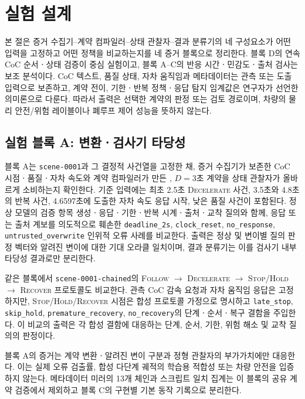 \section{실험 설계}
\label{sec:experiments}

본 절은 증거 수집기--계약 컴파일러--상태 관찰자--결과 분류기의 네 구성요소가 어떤 입력을 고정하고 어떤 정책을 비교하는지를 네 증거 블록으로 정리한다. 블록 D의 연속 CoC 순서ㆍ상태 검증이 중심 실험이고, 블록 A--C의 반응 시간ㆍ민감도ㆍ출처 검사는 보조 분석이다. CoC 텍스트, 품질 상태, 자차 움직임과 메타데이터는 관측 또는 도출 입력으로 보존하고, 계약 전이, 기한ㆍ반복 정책ㆍ응답 탐지 임계값은 연구자가 선언한 의미론으로 다룬다. 따라서 출력은 선택한 계약의 판정 또는 검토 경로이며, 차량의 물리 안전/위험 레이블이나 폐루프 제어 성능을 뜻하지 않는다.

\subsection{실험 블록 A: 변환ㆍ검사기 타당성}
\label{sec:exp-block-a}

블록 A는 \texttt{scene-0001}과 그 결정적 사건열을 고정한 채, 증거 수집기가 보존한 CoC 시점ㆍ품질ㆍ자차 속도와 계약 컴파일러가 만든 \preserve, $D=3$초 계약을 상태 관찰자가 올바르게 소비하는지 확인한다. 기준 입력에는 최초 2.5초 \textsc{Decelerate} 사건, 3.5초와 4.8초의 반복 사건, 4.6597초에 도출한 자차 속도 응답 시작, 낮은 품질 사건이 포함된다. 정상 모델의 검증 항목 생성ㆍ응답ㆍ기한ㆍ반복 시계ㆍ출처ㆍ교착 질의와 함께, 응답 또는 출처 계보를 의도적으로 훼손한 \texttt{deadline\_2s}, \texttt{clock\_reset}, \texttt{no\_response}, \texttt{untrusted\_overwrite} 인위적 오류 사례를 비교한다. 출력은 정상 및 변이별 질의 판정 벡터와 알려진 변이에 대한 기대 오라클 일치이며, 결과 분류기는 이를 검사기 내부 타당성 결과로만 분리한다.

같은 블록에서 \texttt{scene-0001-chained}의 \textsc{Follow} $\rightarrow$ \textsc{Decelerate} $\rightarrow$ \textsc{Stop/Hold} $\rightarrow$ \textsc{Recover} 프로토콜도 비교한다. 관측 CoC 감속 요청과 자차 움직임 응답은 고정하지만, \textsc{Stop/Hold/Recover} 시점은 합성 프로토콜 가정으로 명시하고 \texttt{late\_stop}, \texttt{skip\_hold}, \texttt{premature\_recovery}, \texttt{no\_recovery}의 단계ㆍ순서ㆍ복구 결함을 주입한다. 이 비교의 출력은 각 합성 결함에 대응하는 단계, 순서, 기한, 위험 해소 및 교착 질의의 판정이다.

블록 A의 증거는 계약 변환ㆍ알려진 변이 구분과 정형 관찰자의 부가가치에만 대응한다. 이는 실제 오류 검출률, 합성 다단계 궤적의 학습용 적합성 또는 차량 안전을 입증하지 않는다. 메타데이터 미러의 13개 체인과 스크립트 일치 집계는 이 블록의 공유 계약 검증에서 제외하고 블록 C의 구현별 기본 동작 기록으로 분리한다.

